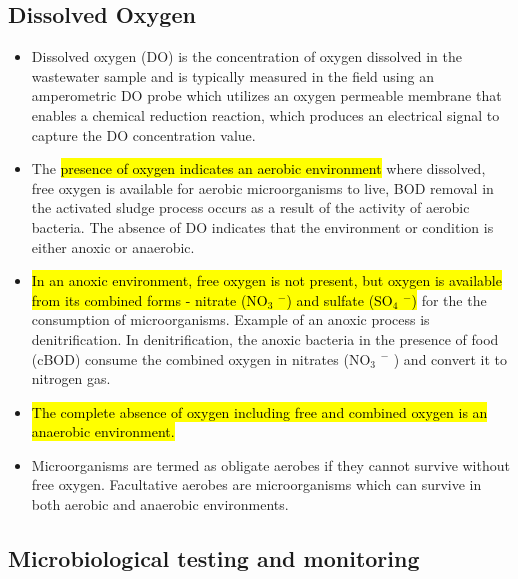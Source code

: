 \subsection{Dissolved Oxygen}	
			\begin{itemize}
				\item Dissolved oxygen (DO) is the concentration of oxygen dissolved in the wastewater sample and is typically measured in the field using an amperometric DO probe which utilizes an oxygen permeable membrane that enables a chemical reduction reaction, which produces an electrical signal to capture the DO concentration value.
				\item The \hl{presence of oxygen indicates an aerobic environment} where dissolved, free oxygen is available for aerobic microorganisms to live, BOD removal in the activated sludge process occurs as a result of the activity of aerobic bacteria.  The absence of DO indicates that the environment or condition is either anoxic or anaerobic.  
				\item \hl{In an anoxic environment, free oxygen is not present, but oxygen is available from its combined  forms - nitrate (NO$_3$ $^-$) and sulfate (SO$_4$ $^-$)} for the the consumption of microorganisms.  Example of an anoxic process is denitrification.  In denitrification, the anoxic bacteria in the presence of food (cBOD) consume the combined oxygen in nitrates (NO$_3$ $^-$ ) and convert it to nitrogen gas.
				\item \hl{The complete absence of oxygen including free and combined oxygen is an anaerobic environment.}
				\item Microorganisms are termed as obligate aerobes if they cannot survive without free oxygen.  Facultative aerobes are microorganisms which can survive in both aerobic and anaerobic environments.  
			\end{itemize}
			
\subsection{Microbiological testing and monitoring}	
			
